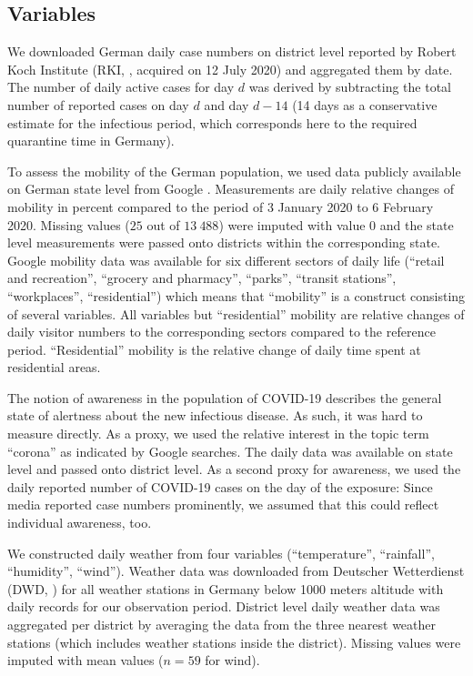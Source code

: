 \documentclass[]{elsarticle} %
\begin{document}
\hypertarget{variables}{%
\subsection{Variables}\label{variables}}

We downloaded German daily case numbers on district level reported by Robert Koch Institute (RKI, \citep{casenumbers_rki}, acquired on 12 July 2020) and aggregated them by date. The number of daily active cases for day \(d\) was derived by subtracting the total number of reported cases on day \(d\) and day \(d-14\) (14 days as a conservative estimate for the infectious period, which corresponds here to the required quarantine time in Germany).

To assess the mobility of the German population, we used data publicly available on German state level from Google \citep{google_mobility}. Measurements are daily relative changes of mobility in percent compared to the period of 3 January 2020 to 6 February 2020. Missing values (\(25\) out of \(13{\ }488\)) were imputed with value \(0\) and the state level measurements were passed onto districts within the corresponding state. Google mobility data was available for six different sectors of daily life (``retail and recreation'', ``grocery and pharmacy'', ``parks'', ``transit stations'', ``workplaces'', ``residential'') which means that ``mobility'' is a construct consisting of several variables. All variables but ``residential'' mobility are relative changes of daily visitor numbers to the corresponding sectors compared to the reference period. ``Residential'' mobility is the relative change of daily time spent at residential areas.

The notion of awareness in the population of COVID-19 describes the general state of alertness about the new infectious disease. As such, it was hard to measure directly. As a proxy, we used the relative interest in the topic term ``corona'' as indicated by Google searches. The daily data was available on state level \citep{google_trends} and passed onto district level. As a second proxy for awareness, we used the daily reported number of COVID-19 cases on the day of the exposure: Since media reported case numbers prominently, we assumed that this could reflect individual awareness, too.

We constructed daily weather from four variables (``temperature'', ``rainfall'', ``humidity'', ``wind''). Weather data was downloaded from Deutscher Wetterdienst (DWD, \citep{dwd_weather}) for all weather stations in Germany below 1000 meters altitude with daily records for our observation period. District level daily weather data was aggregated per district by averaging the data from the three nearest weather stations (which includes weather stations inside the district). Missing values were imputed with mean values (\(n=59\) for wind).
\end{document}
